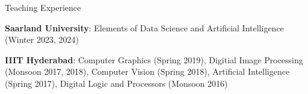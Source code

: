 \documentclass{resume} %
\begin{document}
\vspace{-5pt}
\begin{rSection}{Teaching Experience} \itemsep -3pt
\vspace{-5pt}
\item \textbf{Saarland University}: Elements of Data Science and Artificial Intelligence (Winter 2023, 2024)
\item \textbf{IIIT Hyderabad}: Computer Graphics (Spring 2019), Digitial Image Processing (Monsoon 2017, 2018), Computer Vision (Spring 2018), Artificial Intelligence (Spring 2017), Digital Logic and Processors (Monsoon 2016)






\end{rSection}
\end{document}
